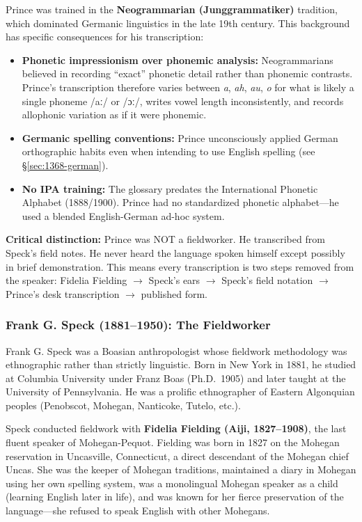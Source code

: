 Prince was trained in the \textbf{Neogrammarian (Junggrammatiker)} tradition,
which dominated Germanic linguistics in the late 19th century. This background
has specific consequences for his transcription:

\begin{itemize}
  \item \textbf{Phonetic impressionism over phonemic analysis:}
    Neogrammarians believed in recording ``exact'' phonetic detail rather
    than phonemic contrasts. Prince's transcription therefore varies between
    \textit{a}, \textit{ah}, \textit{au}, \textit{o} for what is likely a
    single phoneme /aː/ or /ɔː/, writes vowel length inconsistently, and
    records allophonic variation as if it were phonemic.
  \item \textbf{Germanic spelling conventions:} Prince unconsciously applied
    German orthographic habits even when intending to use English spelling
    (see \S\ref{sec:1368-german}).
  \item \textbf{No IPA training:} The glossary predates the International
    Phonetic Alphabet (1888/1900). Prince had no standardized phonetic
    alphabet---he used a blended English-German ad-hoc system.
\end{itemize}

\textbf{Critical distinction:} Prince was NOT a fieldworker. He transcribed
from Speck's field notes. He never heard the language spoken himself except
possibly in brief demonstration. This means every transcription is two steps
removed from the speaker: Fidelia Fielding $\rightarrow$ Speck's ears
$\rightarrow$ Speck's field notation $\rightarrow$ Prince's desk transcription
$\rightarrow$ published form.

\subsubsection{Frank G. Speck (1881--1950): The Fieldworker}

Frank G. Speck was a Boasian anthropologist whose fieldwork methodology was
ethnographic rather than strictly linguistic. Born in New York in 1881, he
studied at Columbia University under Franz Boas (Ph.D.\ 1905) and later
taught at the University of Pennsylvania. He was a prolific ethnographer of
Eastern Algonquian peoples (Penobscot, Mohegan, Nanticoke, Tutelo, etc.).

Speck conducted fieldwork with \textbf{Fidelia Fielding (Aiji, 1827--1908)},
the last fluent speaker of Mohegan-Pequot. Fielding was born in 1827 on the
Mohegan reservation in Uncasville, Connecticut, a direct descendant of the
Mohegan chief Uncas. She was the keeper of Mohegan traditions, maintained a
diary in Mohegan using her own spelling system, was a monolingual Mohegan
speaker as a child (learning English later in life), and was known for her
fierce preservation of the language---she refused to speak English with other
Mohegans.

